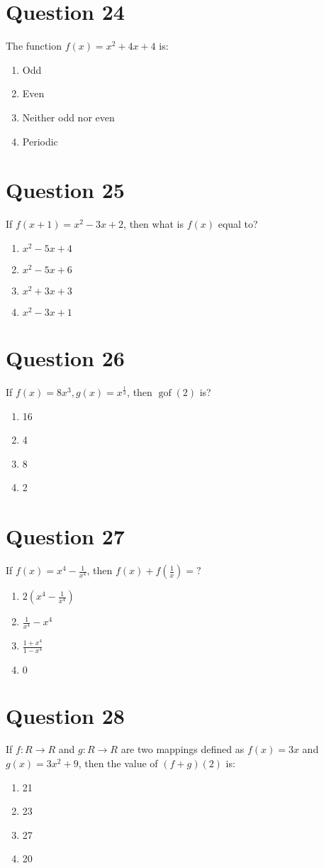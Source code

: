 \documentclass{article}
\begin{document}
\section*{Question 24}
The function \(f(x)=x^{2}+4 x+4\) is:
\begin{enumerate}[label=(\alph*)]
\item Odd
\item Even
\item Neither odd nor even
\item Periodic
\end{enumerate}
\newpage
\section*{Question 25}
If \(f(x+1)=x^{2}-3 x+2\), then what is \(f(x)\) equal to?
\begin{enumerate}[label=(\alph*)]
\item \(x^{2}-5 x+4\)
\item \(x^{2}-5 x+6\)
\item \(x^{2}+3 x+3\)
\item \(x^{2}-3 x+1\)
\end{enumerate}
\newpage
\section*{Question 26}
If \(f(x)=8 x^{3}, g(x)=x^{\frac{1}{3}}\), then \(\operatorname{gof}(2)\) is?
\begin{enumerate}[label=(\alph*)]
\item 16
\item 4
\item 8
\item 2
\end{enumerate}
\newpage
\section*{Question 27}
If \(f(x)=x^{4}-\frac{1}{x^{4}}\), then \(f(x)+f\left(\frac{1}{x}\right)=?\)\newline
\begin{enumerate}[label=(\alph*)]
\item \(2\left(x^{4}-\frac{1}{x^{4}}\right)\)
\item \(\frac{1}{x^{4}}-x^{4}\)
\item \(\frac{1+x^{4}}{1-x^{4}}\)
\item \(0\)
\end{enumerate}
\newpage
\section*{Question 28}
If \(f: R \rightarrow R\) and \(g: R \rightarrow R\) are two mappings defined as \(f(x)=3 x\) and \(g(x)=3 x^{2}+9\), then the value of \((f+g)(2)\) is:
\begin{enumerate}[label=(\alph*)]
\item 21
\item 23
\item 27
\item 20
\end{enumerate}
\newpage
\end{document}
